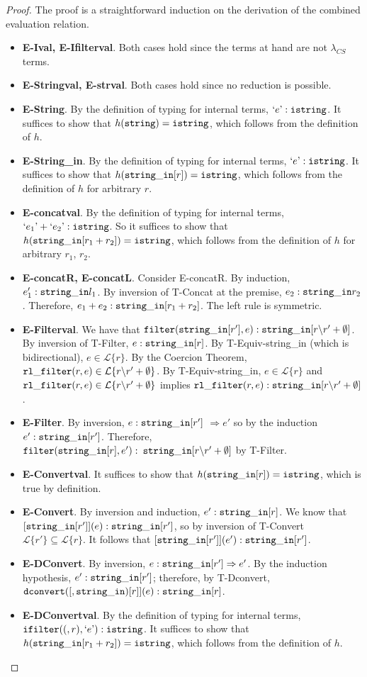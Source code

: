 \documentclass[10pt,preprint]{sigplanconf}
\theoremstyle{definition}
\newcommand{\Lagr}{\mathcal{L}}
\newcommand{\strin}{{\tt string\_in}}
\newcommand{\lang}[1]{\Lagr\{#1\}}
\newcommand{\str}{ {\tt string} }
\newcommand{\istr}{ {\tt istring} }
\newcommand{\dconvert}[2]{ {\tt dconvert}(#1,#2) }
\newcommand{\filter}[2]{ {\tt filter}(#1,#2) }
\newcommand{\ifilter}[2]{ {\tt ifilter}(#1,#2) }
\newcommand{\reduces}{ \Rightarrow }
\newcommand{\istrf}[1]{`#1\textrm'} %
\newcommand{\lcs}{\lambda_{CS}}
\begin{document}
\begin{proof}
The proof is a straightforward induction on the derivation of the combined evaluation relation.
\begin{itemize}[label=$ $,itemsep=1ex]
  \item \textbf{E-Ival, E-Ifilterval}. Both cases hold since the terms at hand are not $\lcs$ terms.
  \item \textbf{E-Stringval, E-strval}. Both cases hold since no reduction is possible. 
  \item \textbf{E-String}. By the definition of typing for internal terms, $\istrf{e} : \istr$. It suffices to show that $h(\str) = \istr$, which follows from the definition of $h$.
  \item \textbf{E-String\_in}. By the definition of typing for internal terms, $\istrf{e} : \istr$. It suffices to show that $h(\strin[r]) = \istr$, which follows from the definition of $h$ for arbitrary $r$.
  \item \textbf{E-concatval}. By the definition of typing for internal terms, $\istrf{e_1} + \istrf{e_2} : \istr$. So it suffices to show that $h(\strin[r_1+r_2]) = \istr$, which follows from the definition of $h$ for arbitrary $r_1$, $r_2$.
  \item \textbf{E-concatR, E-concatL}. Consider E-concatR. By induction, $e_1' : \strin{l_1}$. By inversion of T-Concat at the premise, $e_2 : \strin{r_2}$. Therefore, $e_1 + e_2 : \strin[r_1 + r_2]$. The left rule is symmetric.
  \item \textbf{E-Filterval}. We have that $\filter{\strin[r']}{e}:\strin[r\backslash r' + \emptyset]$. By inversion of T-Filter, $e:\strin[r]$.
    By T-Equiv-string\_in (which is bidirectional), $e \in \lang{r}$.
    By the Coercion Theorem, ${\tt rl\_filter}(r,e) \in \lang{r\backslash r' + \emptyset}$.
    By T-Equiv-string\_in,  $e \in \lang{r}$ and ${\tt rl\_filter}(r,e) \in \lang{r\backslash r' + \emptyset}$ implies ${\tt rl\_filter}(r,e):\strin[r\backslash r' + \emptyset]$.
  \item \textbf{E-Filter}. By inversion, $e : \strin[r']$ $\reduces e'$ so by the induction $e':\strin[r']$.
    Therefore, \\${\tt filter}(\strin[r], e'):$ $\strin[r \backslash r' + \emptyset]$ by T-Filter.
  \item \textbf{E-Convertval}. It suffices to show that $h(\strin[r]) = \istr$, which is true by definition.
  \item \textbf{E-Convert}. By inversion and induction, $e' : \strin[r]$. We know that $[\strin[r']](e) : \strin[r']$, so by inversion of T-Convert $\lang{r'} \subseteq \lang{r}$.
    It follows that $[\strin[r']](e') : \strin[r']$.
  \item \textbf{E-DConvert}. By inversion, $e : \strin[r'] \reduces e'$. By the induction hypothesis, $e' : \strin[r']$; therefore, by T-Dconvert, $\dconvert[\strin[r]](e):\strin[r]$.
  \item \textbf{E-DConvertval}. By the definition of typing for internal terms, $\ifilter(r,\istrf{e}) : \istr$. It suffices to show that $h(\strin[r_1+r_2]) = \istr$, which follows from the definition of $h$.
\end{itemize}
\end{proof}
\end{document}
